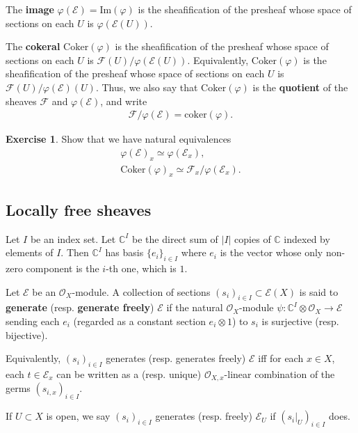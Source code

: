 \documentclass[11pt,b5paper,notitlepage]{article}
\theoremstyle{definition}
\newtheorem{exe}[df]{Exercise}
\theoremstyle{plain}
\newcommand{\scr}{\mathscr}
\newcommand{\coker}{\mathrm{coker}}
\newcommand{\Cbb}{\mathbb C}
\newcommand{\Coker}{\mathrm{Coker}}
\newcommand{\Imag}{\mathrm{Im}}
\numberwithin{equation}{section}
\begin{document}
The \textbf{image} $\varphi(\scr E)=\Imag(\varphi)$ is the sheafification of the presheaf whose space of sections on each $U$ is $\varphi(\scr E(U))$.


The \textbf{cokeral} $\Coker(\varphi)$ is the sheafification of the presheaf whose space of sections on each $U$ is $\scr F(U)/\varphi(\scr E(U))$. Equivalently, $\Coker(\varphi)$ is the sheafification of the presheaf whose space of sections on each $U$ is $\scr F(U)/\varphi(\scr E)(U)$. Thus, we also say that $\Coker(\varphi)$ is the \textbf{quotient} of the sheaves $\scr F$ and $\varphi(\scr E)$, and write
\begin{align}
\scr F/\varphi(\scr E)=\coker(\varphi).	
\end{align}



\begin{exe}
	Show that we have natural equivalences
	\begin{gather}
		\varphi(\scr E)_x\simeq\varphi(\scr E_x),\\
		\Coker(\varphi)_x	\simeq \scr F_x/\varphi(\scr E_x).
	\end{gather}
\end{exe}


\subsection{Locally free sheaves}


Let $I$ be an index set. Let $\Cbb^I$ be the direct sum of  $|I|$ copies of $\Cbb$ indexed by elements of $I$. Then $\Cbb^I$ has basis $\{e_i\}_{i\in I}$ where $e_i$ is the vector whose only non-zero component is the $i$-th one, which is $1$.

Let $\scr E$ be an $\scr O_X$-module. A collection of sections $(s_i)_{i\in I}\subset\scr E(X)$ is said to \textbf{generate} (resp. \textbf{generate freely}) $\scr E$ if the natural $\scr O_X$-module $\psi:\Cbb^I\otimes\scr O_X\rightarrow\scr E$ sending each $e_i$ (regarded as a constant section $e_i\otimes 1$) to $s_i$ is surjective (resp. bijective).

Equivalently, $(s_i)_{i\in I}$ generates (resp. generates freely) $\scr E$ iff for each $x\in X$, each $t\in\scr E_x$ can be written as a (resp. unique) $\scr O_{X,x}$-linear combination of the germs $(s_{i,x})_{i\in I}$.

If $U\subset X$ is open, we say $(s_i)_{i\in I}$ generates (resp. freely) $\scr E_U$ if $(s_i|_U)_{i\in I}$ does.
\end{document}
